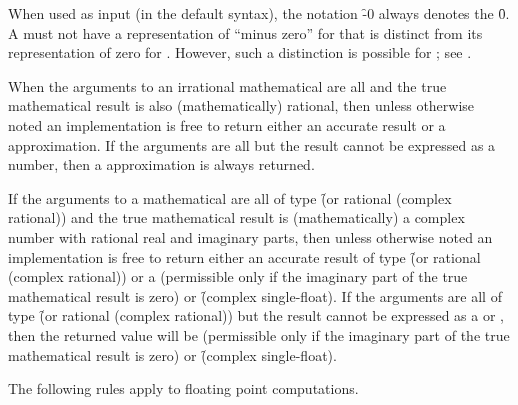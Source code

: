 When used as input (in the default syntax),
the notation \f{-0} always denotes the  \f{0}.
A  must not have a
representation of ``minus zero'' for 
that is distinct from its representation of zero for .
However, such a distinction is possible for ; 
see .

\endsubsubsection%

When the arguments to an irrational mathematical  
are all  and the true mathematical result
is also (mathematically) rational, then unless otherwise noted
an implementation is free to return either an accurate
 result
or a  approximation.
If the arguments are all  
but the result cannot be expressed
as a  number, then a  
approximation is always returned.

If the arguments to a mathematical  are all of type
  \f{(or rational (complex rational))} 
and the true mathematical result is
  (mathematically) a complex number with rational real and imaginary
  parts, then unless otherwise noted an implementation is free to return
  either an accurate result of type \f{(or rational (complex rational))} 
or
  a 
  (permissible only if the imaginary part of the true mathematical
  result is zero) or \f{(complex single-float)}. If the arguments are
  all of type \f{(or rational (complex rational))}
but the result cannot be
  expressed as a  or ,
then the returned
  value will be  
(permissible only if the imaginary
  part of the true mathematical result is zero) or \f{(complex single-float)}.
 
\endsubsubsection%

\endsubsection%

The following rules apply to floating point computations.

